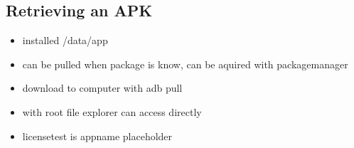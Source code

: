 \subsection{Retrieving an APK} \label{subsection:tools-apk}
\begin{itemize}
    \item installed /data/app
    \item can be pulled when package is know, can be aquired with packagemanager
    \item download to computer with adb pull
    \item with root file explorer can access directly
    \item licensetest is appname placeholder
\end{itemize}
